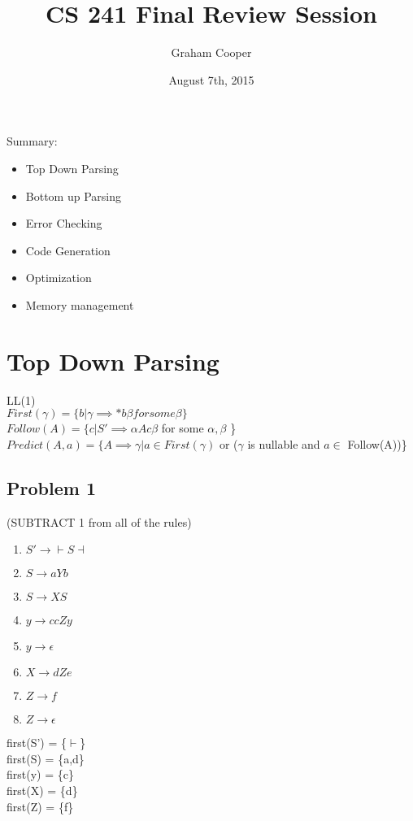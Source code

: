 \documentclass[12pt]{article}
\title{\vspace{-15ex}CS 241 Final Review Session\vspace{-1ex}}
\date{August 7th, 2015}
\author{Graham Cooper}
\begin{document}
	\maketitle
	Summary:\\
	\begin{itemize}
		\item Top Down Parsing
		\item Bottom up Parsing
		\item Error Checking
		\item Code Generation
		\item Optimization
		\item Memory management
	\end{itemize}
	
	\section*{Top Down Parsing}
	LL(1)\\
	$First(\gamma) = \{b| \gamma \implies *b\beta for some \beta \}$\\
	$Follow(A) = \{c | S' \implies \alpha A c \beta$ for some $\alpha, \beta$ \}\\
	$Predict(A,a) = \{A \implies \gamma | a \in First(\gamma)$ or ($\gamma$ is nullable and $a \in$ Follow(A))\}\\
	
	\subsection*{Problem 1}
	(SUBTRACT 1 from all of the rules)
	\begin{enumerate}
		\item $S' \rightarrow \vdash S \dashv$
		\item $S \rightarrow aYb$
		\item $S \rightarrow XS$
		\item $y \rightarrow ccZy$
		\item $y \rightarrow \epsilon$
		\item $X \rightarrow dZe$
		\item $Z \rightarrow f$
		\item $Z \rightarrow \epsilon$
	\end{enumerate}
	first(S') = \{$\vdash $\}\\
	first(S) = \{a,d\}\\
	first(y) = \{c\}\\
	first(X) = \{d\}\\
	first(Z) = \{f\}\\
	
\end{document}
